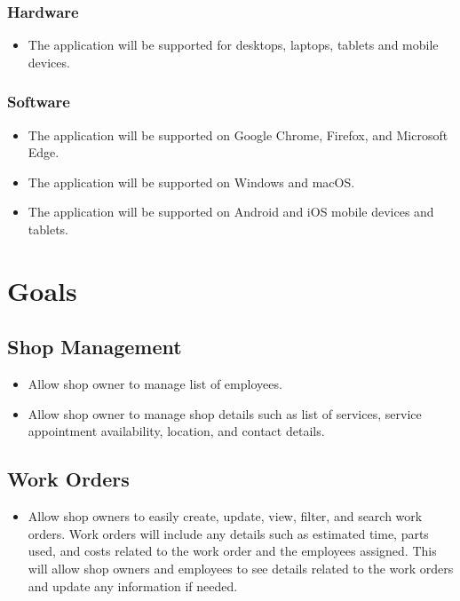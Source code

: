 \documentclass{article}
\begin{document}
\subsubsection{Hardware}
\begin{itemize}
	\item The application will be supported for desktops, laptops, tablets and mobile devices.
\end{itemize}
\subsubsection{Software}
\begin{itemize}
	\item The application will be supported on Google Chrome, Firefox, and Microsoft Edge.
	\item The application will be supported on Windows and macOS.
	\item The application will be supported on Android and iOS mobile devices and tablets.
\end{itemize}

\section{Goals}
\subsection{Shop Management}
\begin{itemize}
	\item Allow shop owner to manage list of employees.
	\item Allow shop owner to manage shop details such as list of services, service appointment availability,
	      location, and contact details.
\end{itemize}

\subsection{Work Orders}
\begin{itemize}
	\item Allow shop owners to easily create, update, view, filter, and search work orders. Work orders will
	      include any details such as estimated time, parts used, and costs related to the work order and the
	      employees assigned. This will allow shop owners and employees to see details related to the work
	      orders and update any information if needed.
\end{itemize}
\end{document}
